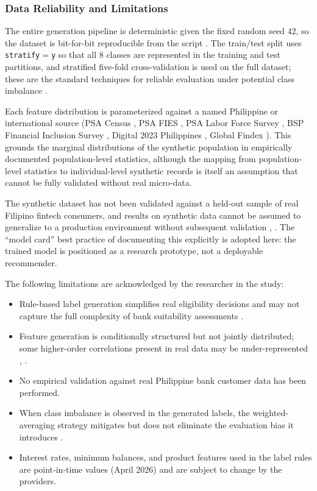 \documentclass[journal]{./IEEE/IEEEtran}
\begin{document}
\subsubsection{Data Reliability and Limitations}

The entire generation pipeline is deterministic given the fixed random seed $42$, so the dataset is bit-for-bit reproducible from the script \cite{ref60}. The train/test split uses \texttt{stratify$=$y} so that all 8 classes are represented in the training and test partitions, and stratified five-fold cross-validation is used on the full dataset; these are the standard techniques for reliable evaluation under potential class imbalance \cite{ref59}.

Each feature distribution is parameterized against a named Philippine or international source (PSA Census \cite{ref39}, PSA FIES \cite{ref40}, PSA Labor Force Survey \cite{ref41}, BSP Financial Inclusion Survey \cite{ref35}, Digital 2023 Philippines \cite{ref42}, Global Findex \cite{ref66}). This grounds the marginal distributions of the synthetic population in empirically documented population-level statistics, although the mapping from population-level statistics to individual-level synthetic records is itself an assumption that cannot be fully validated without real micro-data.

The synthetic dataset has not been validated against a held-out sample of real Filipino fintech consumers, and results on synthetic data cannot be assumed to generalize to a production environment without subsequent validation \cite{ref46}, \cite{ref29}. The ``model card'' best practice of documenting this explicitly \cite{ref61} is adopted here: the trained model is positioned as a research prototype, not a deployable recommender.

The following limitations are acknowledged by the researcher in the study:

\begin{itemize}
    \item Rule-based label generation simplifies real eligibility decisions and may not capture the full complexity of bank suitability assessments \cite{ref46}.
    \item Feature generation is conditionally structured but not jointly distributed; some higher-order correlations present in real data may be under-represented \cite{ref29}, \cite{ref34}.
    \item No empirical validation against real Philippine bank customer data has been performed.
    \item When class imbalance is observed in the generated labels, the weighted-averaging strategy mitigates but does not eliminate the evaluation bias it introduces \cite{ref58}.
    \item Interest rates, minimum balances, and product features used in the label rules are point-in-time values (April 2026) and are subject to change by the providers.
\end{itemize}
\end{document}
